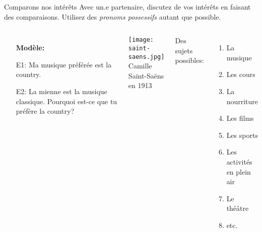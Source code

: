 \begin{frame}{Comparons nos intérêts}
  Avec un.e partenaire, discutez de vos intérêts en faisant des comparaisons.
  Utilisez des \emph{pronoms possessifs} autant que possible.
  \begin{columns}
      \begin{itemize}
        \small
        \item[] \textbf{Modèle:}
        \item[E1:] Ma musique préférée est la country.
        \item[E2:] \alert{La mienne} est la musique classique. Pourquoi est-ce que tu préfère la country?
      \end{itemize}
      \begin{center}
        \texttt{[image: saint-saens.jpg]} \\
        {\scriptsize Camille Saint-Saëns en 1913}
      \end{center}
      Des sujets possibles:
      \begin{enumerate}
        \item La musique
        \item Les cours
        \item La nourriture
        \item Les films
        \item Les sports
        \item Les activités en plein air
        \item Le théâtre
        \item etc.
      \end{enumerate}
  \end{columns}
\end{frame}